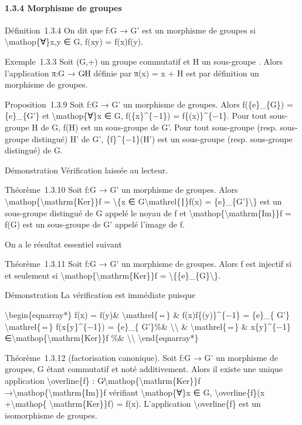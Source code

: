 \documentclass[]{article}
\begin{document}
\paragraph{1.3.4 Morphisme de groupes}

Définition~1.3.4 On dit que f:G → G' est un morphisme de groupes si
\textbackslash{}mathop\{∀\}x,y ∈ G, f(xy) = f(x)f(y).

Exemple~1.3.3 Soit (G,+) un groupe commutatif et H un sous-groupe .
Alors l'application π:G → G∕H définie par π(x) = x + H est par
définition un morphisme de groupes.

Proposition~1.3.9 Soit f:G → G' un morphisme de groupes. Alors
f(\{e\}\_\{G\}) = \{e\}\_\{G'\} et \textbackslash{}mathop\{∀\}x ∈ G,
f(\{x\}\^{}\{−1\}) = f\{(x)\}\^{}\{−1\}. Pour tout sous-groupe H de G,
f(H) est un sous-groupe de G'. Pour tout sous-groupe (resp. sous-groupe
distingué) H' de G', \{f\}\^{}\{−1\}(H') est un sous-groupe (resp.
sous-groupe distingué) de G.

Démonstration Vérification laissée au lecteur.

Théorème~1.3.10 Soit f:G → G' un morphisme de groupes. Alors
\textbackslash{}mathop\{\textbackslash{}mathrm\{Ker\}\}f =
\textbackslash{}\{x ∈ G\textbackslash{}mathrel\{∣\}f(x) =
\{e\}\_\{G'\}\textbackslash{}\} est un sous-groupe distingué de G appelé
le noyau de f et \textbackslash{}mathop\{\textbackslash{}mathrm\{Im\}\}f
= f(G) est un sous-groupe de G' appelé l'image de f.

On a le résultat essentiel suivant

Théorème~1.3.11 Soit f:G → G' un morphisme de groupes. Alors f est
injectif si et seulement si
\textbackslash{}mathop\{\textbackslash{}mathrm\{Ker\}\}f =
\textbackslash{}\{\{e\}\_\{G\}\textbackslash{}\}.

Démonstration La vérification est immédiate puisque

\textbackslash{}begin\{eqnarray*\} f(x) = f(y)\&
\textbackslash{}mathrel\{⇔\} \& f(x)f\{(y)\}\^{}\{−1\} = \{e\}\_\{ G'\}
\textbackslash{}mathrel\{⇔\} f(x\{y\}\^{}\{−1\}) = \{e\}\_\{ G'\}\%\&
\textbackslash{}\textbackslash{} \& \textbackslash{}mathrel\{⇔\} \&
x\{y\}\^{}\{−1\}
∈\textbackslash{}mathop\{\textbackslash{}mathrm\{Ker\}\}f \%\&
\textbackslash{}\textbackslash{} \textbackslash{}end\{eqnarray*\}

Théorème~1.3.12 (factorisation canonique). Soit f:G → G' un morphisme de
groupes, G étant commutatif et noté additivement. Alors il existe une
unique application \textbackslash{}overline\{f\} :
G∕\textbackslash{}mathop\{\textbackslash{}mathrm\{Ker\}\}f
→\textbackslash{}mathop\{\textbackslash{}mathrm\{Im\}\}f vérifiant
\textbackslash{}mathop\{∀\}x ∈ G, \textbackslash{}overline\{f\}(x
+\textbackslash{}mathop\{ \textbackslash{}mathrm\{Ker\}\}f) = f(x).
L'application \textbackslash{}overline\{f\} est un isomorphisme de
groupes.
\end{document}
